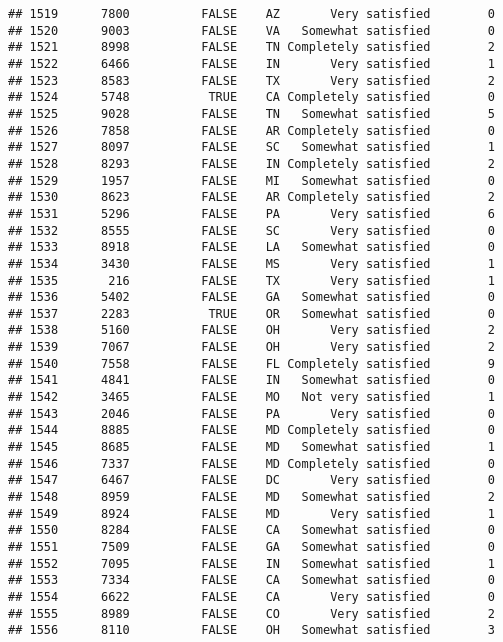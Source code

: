 \documentclass[]{book}
\theoremstyle{definition}
\theoremstyle{definition}
\theoremstyle{remark}
\begin{document}
\begin{verbatim}
## 1519      7800          FALSE    AZ       Very satisfied        0
## 1520      9003          FALSE    VA   Somewhat satisfied        0
## 1521      8998          FALSE    TN Completely satisfied        2
## 1522      6466          FALSE    IN       Very satisfied        1
## 1523      8583          FALSE    TX       Very satisfied        2
## 1524      5748           TRUE    CA Completely satisfied        0
## 1525      9028          FALSE    TN   Somewhat satisfied        5
## 1526      7858          FALSE    AR Completely satisfied        0
## 1527      8097          FALSE    SC   Somewhat satisfied        1
## 1528      8293          FALSE    IN Completely satisfied        2
## 1529      1957          FALSE    MI   Somewhat satisfied        0
## 1530      8623          FALSE    AR Completely satisfied        2
## 1531      5296          FALSE    PA       Very satisfied        6
## 1532      8555          FALSE    SC       Very satisfied        0
## 1533      8918          FALSE    LA   Somewhat satisfied        0
## 1534      3430          FALSE    MS       Very satisfied        1
## 1535       216          FALSE    TX       Very satisfied        1
## 1536      5402          FALSE    GA   Somewhat satisfied        0
## 1537      2283           TRUE    OR   Somewhat satisfied        0
## 1538      5160          FALSE    OH       Very satisfied        2
## 1539      7067          FALSE    OH       Very satisfied        2
## 1540      7558          FALSE    FL Completely satisfied        9
## 1541      4841          FALSE    IN   Somewhat satisfied        0
## 1542      3465          FALSE    MO   Not very satisfied        1
## 1543      2046          FALSE    PA       Very satisfied        0
## 1544      8885          FALSE    MD Completely satisfied        0
## 1545      8685          FALSE    MD   Somewhat satisfied        1
## 1546      7337          FALSE    MD Completely satisfied        0
## 1547      6467          FALSE    DC       Very satisfied        0
## 1548      8959          FALSE    MD   Somewhat satisfied        2
## 1549      8924          FALSE    MD       Very satisfied        1
## 1550      8284          FALSE    CA   Somewhat satisfied        0
## 1551      7509          FALSE    GA   Somewhat satisfied        0
## 1552      7095          FALSE    IN   Somewhat satisfied        1
## 1553      7334          FALSE    CA   Somewhat satisfied        0
## 1554      6622          FALSE    CA       Very satisfied        0
## 1555      8989          FALSE    CO       Very satisfied        2
## 1556      8110          FALSE    OH   Somewhat satisfied        3

\end{verbatim}
\end{document}
